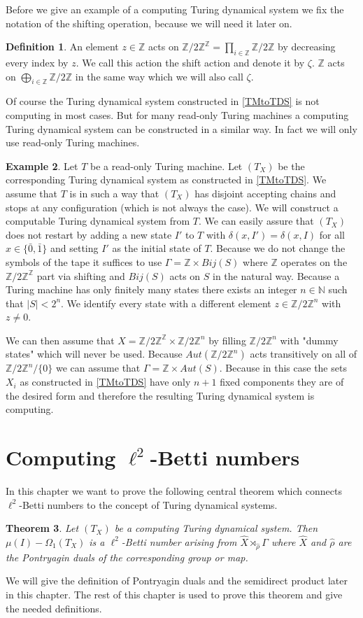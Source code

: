 \documentclass[12pt,a4paper]{scrartcl}
\theoremstyle{plain}
\newtheorem{Theorem}{Theorem}[section]
\theoremstyle{definition}
\newtheorem{Definition}[Theorem]{Definition}
\newtheorem{Example}[Theorem]{Example}
\numberwithin{equation}{section}
\newcommand{\Z}{\mathbb{Z}} %
\newcommand{\N}{\mathbb{N}} %
\newcommand{\2}{\mathbb{Z} / 2 \mathbb{Z}}
\newcommand{\1}{\bar{1}}
\newcommand{\0}{\bar{0}}
\begin{document}
Before we give an example of a computing Turing dynamical system we fix the notation of the shifting operation, because we will need it later on.
\begin{Definition} \label{shift}
	An element $z \in \Z$ acts on $\2^{\Z} = \prod_{i \in \Z} \2$ by decreasing every index by $z$. We call this action the shift action and denote it by $\zeta$. $\Z$ acts on $\bigoplus_{i \in \Z} \2$ in the same way which we will also call $\zeta$.
\end{Definition}
Of course the Turing dynamical system constructed in \ref{TMtoTDS} is not computing in most cases. But for many read-only Turing machines a computing Turing dynamical system can be constructed in a similar way. In fact we will only use read-only Turing machines.
\begin{Example} \label{roTMtoTDS}
	Let $T$ be a read-only Turing machine. Let $(T_X)$ be the corresponding Turing dynamical system as constructed in \ref{TMtoTDS}. We assume that $T$ is in such a way that $(T_X)$ has disjoint accepting chains and stops at any configuration (which is not always the case). We will construct a computable Turing dynamical system from $T$.  We can easily assure that $(T_X)$ does not restart by adding a new state $I'$ to $T$ with $\delta(x, I') = \delta(x, I)$ for all $x \in \{ \0, \1 \}$ and setting $I'$ as the initial state of $T$. Because we do not change the symbols of the tape it suffices to use $\Gamma = \Z \times Bij(S)$ where $\Z$ operates on the $\2^\Z$ part via shifting and $Bij(S)$ acts on $S$ in the natural way. Because a Turing machine has only finitely many states there exists an integer $n \in \N$ such that $|S| < 2^n$. We identify every state with a different element $z \in \2^n$ with $z \neq 0$.
	
	 We can then assume that $X = \2^\Z \times \2^n$ by filling $\2^n$ with "dummy states" which will never be used. Because $Aut(\2^n)$ acts transitively on all of $\2^n / \{0\}$ we can assume that $\Gamma = \Z \times Aut(S)$. Because in this case the sets $X_i$ as constructed in \ref{TMtoTDS} have only $n+1$ fixed components they are of the desired form and therefore the resulting Turing dynamical system is computing.
\end{Example}

\section{Computing $\ell^2$-Betti numbers}
In this chapter we want to prove the following central theorem which connects $\ell^2$-Betti numbers to the concept of Turing dynamical systems.
\begin{Theorem} \label{HS}
	Let $(T_X)$ be a computing Turing dynamical system. Then $\mu (I) - \Omega_1(T_X)$ is a $\ell^2$-Betti number arising from $\hat{X} \rtimes_{\hat{\rho}} \Gamma$ where $\hat{X}$ and $\hat{\rho}$ are the Pontryagin duals of the corresponding group or map.
\end{Theorem}
We will give the definition of Pontryagin duals and the semidirect product later in this chapter. The rest of this chapter is used to prove this theorem and give the needed definitions.
\end{document}
